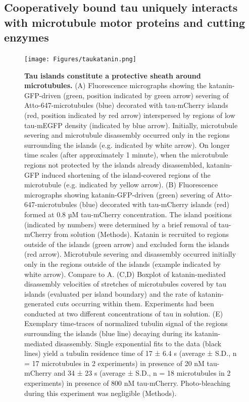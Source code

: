 \subsection{Cooperatively bound tau uniquely interacts with microtubule motor proteins and cutting enzymes}
\begin{figure}[h!]
\centering
\texttt{[image: Figures/taukatanin.png]}
\caption[Tau islands constitute a protective sheath around microtubules.]{
\textbf{Tau islands constitute a protective sheath around microtubules.} (A) Fluorescence micrographs showing the katanin-GFP-driven (green, position indicated by green arrow) severing of Atto-647-microtubules (blue) decorated with tau-mCherry islands (red, position indicated by red arrow) interspersed by regions of low tau-mEGFP density (indicated by blue arrow). Initially, microtubule severing and microtubule disassembly occurred only in the regions surrounding the islands (e.g. indicated by white arrow). On longer time scales (after approximately 1 minute), when the microtubule regions not protected by the islands already disassembled, katanin-GFP induced shortening of the island-covered regions of the microtubule (e.g. indicated by yellow arrow). (B) Fluorescence micrographs showing katanin-GFP-driven (green) severing of Atto-647-microtubules (blue) decorated with tau-mCherry islands (red) formed at 0.8 µM tau-mCherry concentration. The island positions (indicated by numbers) were determined by a brief removal of tau-mCherry from solution (Methods). Katanin is recruited to regions outside of the islands (green arrow) and excluded form the islands (red arrow). Microtubule severing and disassembly occurred initially only in the regions outside of the islands (example indicated by white arrow). Compare to A. (C,D) Boxplot of katanin-mediated disassembly velocities of stretches of microtubules covered by tau islands (evaluated per island boundary) and the rate of katanin-generated cuts occurring within them. Experiments had been conducted at two different concentrations of tau in solution. (E) Exemplary time-traces of normalized tubulin signal of the regions surrounding the islands (blue line) decaying during its katanin-mediated disassembly. Single exponential fits to the data (black lines) yield a tubulin residence time of 17 ± 6.4 s (average ± S.D., n = 17 microtubules in 2 experiments) in presence of 20 nM tau-mCherry and 34 ± 23 s (average ± S.D., n = 18 microtubules in 2 experiments) in presence of 800 nM tau-mCherry. Photo-bleaching during this experiment was negligible (Methods).
	}\label{taukatanin}
\end{figure}
